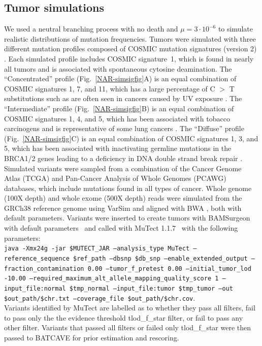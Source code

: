 \documentclass[a4,center,fleqn]{NAR}
\newcommand{\batcave}{BATCAVE\xspace}
\begin{document}
\subsection{Tumor simulations}
We used a neutral branching process with no death and $\mu=3\cdot10^{-6}$ to simulate realistic distributions of mutation frequencies.
Tumors were simulated with three different mutation profiles composed of COSMIC mutation signatures (version 2) \cite{Cosmic_consortium}.
Each simulated profile includes COSMIC signature~1, which is found in nearly all tumors and is associated with spontaneous cytosine deamination.
The ``Concentrated'' profile (Fig.~\ref{NAR-simsigfig}A) is an equal combination of COSMIC signatures 1, 7, and 11, which has a large percentage of C $>$ T substitutions such as are often seen in cancers caused by UV exposure \cite{Alexandrov2013}.
The ``Intermediate'' profile (Fig.~\ref{NAR-simsigfig}B) is an equal combination of COSMIC signatures 1, 4, and 5, which has been associated with tobacco carcinogens and is representative of some lung cancers \cite{Alexandrov2013}.
The ``Diffuse'' profile (Fig.~\ref{NAR-simsigfig}C) is an equal combination of COSMIC signatures 1, 3, and 5, which has been associated with inactivating germline mutations in the BRCA1/2 genes leading to a deficiency in DNA double strand break repair \cite{Nik-Zainal2016}.
Simulated variants were sampled from a combination of the Cancer Genome Atlas (TCGA) and Pan-Cancer Analysis of Whole Genomes (PCAWG) databases, which include mutations found in all types of cancer.
Whole genome (100X depth) and whole exome (500X depth) reads were simulated from the GRCh38 reference genome using VarSim \cite{Mu2015} and aligned with BWA \cite{Li2009a}, both with default parameters.
Variants were inserted to create tumors with BAMSurgeon with default parameters~\cite{Ewing2015a} and called with MuTect 1.1.7~\cite{Cibulskis2013} with the following parameters:\\
\texttt{\small java -Xmx24g -jar \$MUTECT\_JAR --analysis\_type MuTect 
        --reference\_sequence \$ref\_path 
        --dbsnp \$db\_snp 
        --enable\_extended\_output 
        --fraction\_contamination 0.00 
        --tumor\_f\_pretest 0.00 
        --initial\_tumor\_lod -10.00 
        --required\_maximum\_alt\_allele\_mapping\_quality\_score 1 
        --input\_file:normal \$tmp\_normal 
        --input\_file:tumor \$tmp\_tumor 
        --out \$out\_path/\$chr.txt 
        --coverage\_file \$out\_path/\$chr.cov}.\\
Variants identified by MuTect are labelled as to whether they pass all filters, fail to pass only the the evidence threshold \textrm{tlod\_f\_star} filter, or fail to pass any other filter. 
Variants that passed all filters or failed only \textrm{tlod\_f\_star} were then passed to \batcave for prior estimation and rescoring.
\end{document}
